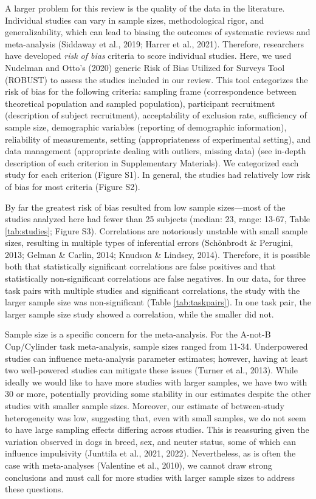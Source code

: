 \documentclass[
  ,pub,floatsintext]{apa6}
\begin{document}
A larger problem for this review is the quality of the data in the literature. Individual studies can vary in sample sizes, methodological rigor, and generalizability, which can lead to biasing the outcomes of systematic reviews and meta-analysis (Siddaway et al., 2019; Harrer et al., 2021). Therefore, researchers have developed \emph{risk of bias} criteria to score individual studies. Here, we used Nudelman and Otto's (2020) generic Risk of Bias Utilized for Surveys Tool (ROBUST) to assess the studies included in our review. This tool categorizes the risk of bias for the following criteria: sampling frame (correspondence between theoretical population and sampled population), participant recruitment (description of subject recruitment), acceptability of exclusion rate, sufficiency of sample size, demographic variables (reporting of demographic information), reliability of measurements, setting (appropriateness of experimental setting), and data management (appropriate dealing with outliers, missing data) (see in-depth description of each criterion in Supplementary Materials). We categorized each study for each criterion (Figure S1). In general, the studies had relatively low risk of bias for most criteria (Figure S2).

By far the greatest risk of bias resulted from low sample sizes---most of the studies analyzed here had fewer than 25 subjects (median: 23, range: 13-67, Table \ref{tab:studies}; Figure S3). Correlations are notoriously unstable with small sample sizes, resulting in multiple types of inferential errors (Schönbrodt \& Perugini, 2013; Gelman \& Carlin, 2014; Knudson \& Lindsey, 2014). Therefore, it is possible both that statistically significant correlations are false positives and that statistically non-significant correlations are false negatives. In our data, for three task pairs with multiple studies and significant correlations, the study with the larger sample size was non-significant (Table \ref{tab:taskpairs}). In one task pair, the larger sample size study showed a correlation, while the smaller did not.


Sample size is a specific concern for the meta-analysis. For the A-not-B Cup/Cylinder task meta-analysis, sample sizes ranged from 11-34. Underpowered studies can influence meta-analysis parameter estimates; however, having at least two well-powered studies can mitigate these issues (Turner et al., 2013). While ideally we would like to have more studies with larger samples, we have two with 30 or more, potentially providing some stability in our estimates despite the other studies with smaller sample sizes. Moreover, our estimate of between-study heterogeneity was low, suggesting that, even with small samples, we do not seem to have large sampling effects differing across studies. This is reassuring given the variation observed in dogs in breed, sex, and neuter status, some of which can influence impulsivity (Junttila et al., 2021, 2022). Nevertheless, as is often the case with meta-analyses (Valentine et al., 2010), we cannot draw strong conclusions and must call for more studies with larger sample sizes to address these questions.
\end{document}
